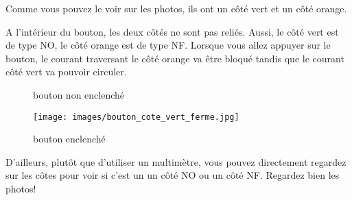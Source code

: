 \documentclass{article}
\begin{document}
Comme vous pouvez le voir sur les photos, ils ont un côté vert et un côté orange. 

\newpage
A l'intérieur du bouton, les deux côtés ne sont pas reliés. Aussi, le côté vert est de type NO, le côté orange est de type NF. Lorsque vous allez appuyer sur le bouton, le courant traversant le côté orange va être bloqué tandis que le courant côté vert va pouvoir circuler.

\begin{figure}[h]
    \begin{minipage}{0.6\textwidth}
        \centering
        \captionsetup{labelformat=empty}
        \caption{bouton non enclenché}
    \end{minipage}
    \hfill
    \begin{minipage}{0.45\textwidth}
        \centering
        \texttt{[image: images/bouton\_cote\_vert\_ferme.jpg]}
        \captionsetup{labelformat=empty}
        \caption{bouton enclenché}
    \end{minipage}
\end{figure}

D'ailleurs, plutôt que d'utiliser un multimètre, vous pouvez directement regardez sur les côtes pour voir si c'est un un côté NO ou un côté NF. Regardez bien les photos!
\end{document}
